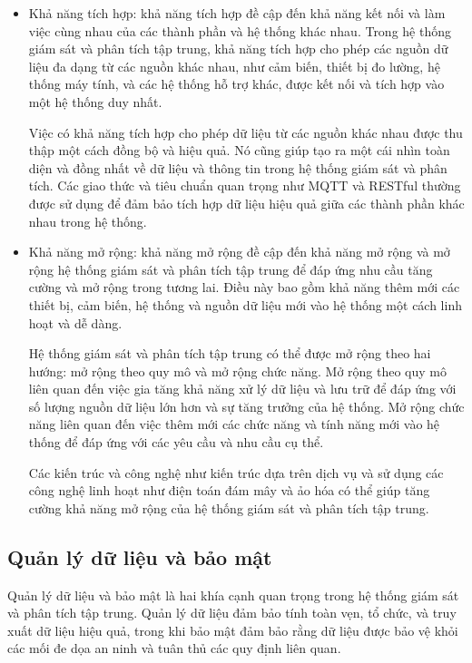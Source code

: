 \begin{itemize}
	\item Khả năng tích hợp: khả năng tích hợp đề cập đến khả năng kết nối và làm việc cùng nhau của các thành phần và hệ thống khác nhau. Trong hệ thống giám sát và phân tích tập trung, khả năng tích hợp cho phép các nguồn dữ liệu đa dạng từ các nguồn khác nhau, như cảm biến, thiết bị đo lường, hệ thống máy tính, và các hệ thống hỗ trợ khác, được kết nối và tích hợp vào một hệ thống duy nhất.
	
	Việc có khả năng tích hợp cho phép dữ liệu từ các nguồn khác nhau được thu thập một cách đồng bộ và hiệu quả. Nó cũng giúp tạo ra một cái nhìn toàn diện và đồng nhất về dữ liệu và thông tin trong hệ thống giám sát và phân tích. Các giao thức và tiêu chuẩn quan trọng như MQTT và RESTful thường được sử dụng để đảm bảo tích hợp dữ liệu hiệu quả giữa các thành phần khác nhau trong hệ thống.
	\item Khả năng mở rộng: khả năng mở rộng đề cập đến khả năng mở rộng và mở rộng hệ thống giám sát và phân tích tập trung để đáp ứng nhu cầu tăng cường và mở rộng trong tương lai. Điều này bao gồm khả năng thêm mới các thiết bị, cảm biến, hệ thống và nguồn dữ liệu mới vào hệ thống một cách linh hoạt và dễ dàng.
	
	Hệ thống giám sát và phân tích tập trung có thể được mở rộng theo hai hướng: mở rộng theo quy mô và mở rộng chức năng. Mở rộng theo quy mô liên quan đến việc gia tăng khả năng xử lý dữ liệu và lưu trữ để đáp ứng với số lượng nguồn dữ liệu lớn hơn và sự tăng trưởng của hệ thống. Mở rộng chức năng liên quan đến việc thêm mới các chức năng và tính năng mới vào hệ thống để đáp ứng với các yêu cầu và nhu cầu cụ thể.
	
	Các kiến trúc và công nghệ như kiến trúc dựa trên dịch vụ và sử dụng các công nghệ linh hoạt như điện toán đám mây và ảo hóa có thể giúp tăng cường khả năng mở rộng của hệ thống giám sát và phân tích tập trung.
\end{itemize}

\subsection{Quản lý dữ liệu và bảo mật}
Quản lý dữ liệu và bảo mật là hai khía cạnh quan trọng trong hệ thống giám sát và phân tích tập trung. Quản lý dữ liệu đảm bảo tính toàn vẹn, tổ chức, và truy xuất dữ liệu hiệu quả, trong khi bảo mật đảm bảo rằng dữ liệu được bảo vệ khỏi các mối đe dọa an ninh và tuân thủ các quy định liên quan.

